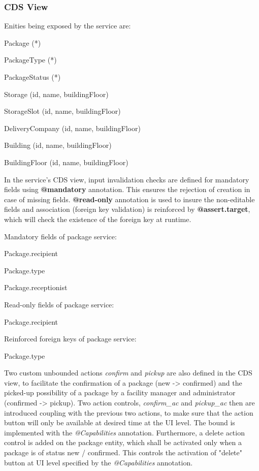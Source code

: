 \subsubsection{CDS View}

Enities being exposed by the service are:
\begin{compactenum}
	\item Package (*)
    \item PackageType (*)
    \item PackageStatus (*)
    \item Storage (id, name, buildingFloor)
    \item StorageSlot (id, name, buildingFloor)
    \item DeliveryCompany (id, name, buildingFloor)
    \item Building (id, name, buildingFloor)
    \item BuildingFloor (id, name, buildingFloor)
\end{compactenum}

\bigskip
In the service's CDS view, input invalidation checks are defined for mandatory fields using \textbf{@mandatory} annotation. This ensures the rejection of creation in case of missing fields. \textbf{@read-only} annotation is used to insure the non-editable fields and association (foreign key validation) is reinforced by \textbf{@assert.target}, which will check the existence of the foreign key at runtime.

\bigskip
Mandatory fields of package service:
\begin{compactenum}
	\item Package.recipient
    \item Package.type
    \item Package.receptionist
\end{compactenum}

\bigskip
Read-only fields of package service:
\begin{compactenum}
	\item Package.recipient
\end{compactenum}

\bigskip
Reinforced foreign keys of package service:
\begin{compactenum}
	\item Package.type
\end{compactenum}

\bigskip
Two custom unbounded actions \textit{confirm} and \textit{pickup} are also defined in the CDS view, to facilitate the confirmation of a package (new -> confirmed) and the picked-up possibility of a package by a facility manager and administrator (confirmed -> pickup). Two action controls, \textit{confirm\_ac} and \textit{pickup\_ac} then are introduced coupling with the previous two actions, to make sure that the action button will only be available at desired time at the UI level. The bound is implemented with the \textit{@Capabilities} annotation. Furthermore, a delete action control is added on the package entity, which shall be activated only when a package is of status new / confirmed. This controls the activation of "delete" button at UI level specified by the \textit{@Capabilities} annotation. 

